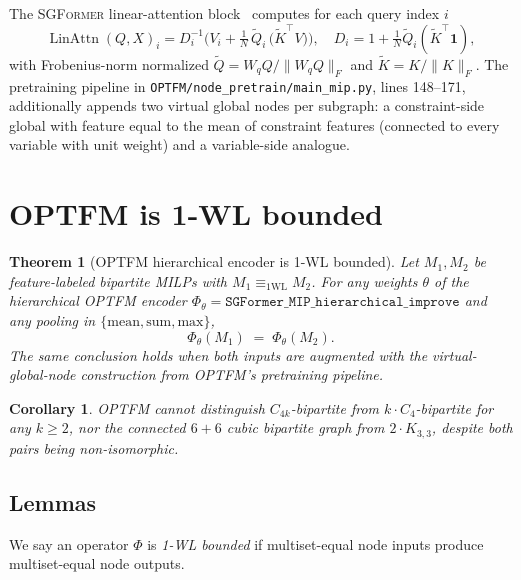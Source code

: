 \documentclass[11pt]{article}
\theoremstyle{plain}
\newtheorem{theorem}{Theorem}
\newtheorem{corollary}{Corollary}
\theoremstyle{definition}
\theoremstyle{remark}
\newcommand{\optfm}{\textsc{OPTFM}}
\newcommand{\sgformer}{\textsc{SGFormer}}
\DeclareMathOperator*{\LinAttn}{LinAttn}
\begin{document}
The \sgformer{} linear-attention block~\cite{wu2023sgformer} computes for each
query index $i$
\begin{equation}\label{eq:linattn}
\LinAttn(Q,X)_i = D_i^{-1}\!\Big(V_i + \tfrac{1}{N}\,\tilde Q_i\,\big(\tilde K^\top V\big)\Big),
\quad D_i = 1 + \tfrac{1}{N}\tilde Q_i (\tilde K^\top \mathbf 1),
\end{equation}
with Frobenius-norm normalized $\tilde Q = W_q Q / \|W_q Q\|_F$ and
$\tilde K = K/\|K\|_F$. The pretraining pipeline in
\texttt{OPTFM/node\_pretrain/main\_mip.py}, lines 148--171, additionally
appends two virtual global nodes per subgraph: a constraint-side global with
feature equal to the mean of constraint features (connected to every variable
with unit weight) and a variable-side analogue.

\section{OPTFM is 1-WL bounded}
\label{sec:theorem}

\begin{theorem}[\optfm{} hierarchical encoder is 1-WL bounded]
\label{thm:main}
Let $M_1, M_2$ be feature-labeled bipartite MILPs with $M_1 \equiv_{1\text{WL}} M_2$.
For \emph{any} weights $\theta$ of the hierarchical \optfm{} encoder
\(\Phi_\theta = \texttt{SGFormer\_MIP\_hierarchical\_improve}\) and any pooling
in $\{\text{mean},\text{sum},\text{max}\}$,
\begin{equation*}
\Phi_\theta(M_1) \;=\; \Phi_\theta(M_2).
\end{equation*}
The same conclusion holds when both inputs are augmented with the
virtual-global-node construction from \optfm{}'s pretraining pipeline.
\end{theorem}

\begin{corollary}\label{cor:concrete}
\optfm{} cannot distinguish $C_{4k}$-bipartite from $k\cdot C_4$-bipartite for
any $k\!\ge\!2$, nor the connected $6{+}6$ cubic bipartite graph from
$2\cdot K_{3,3}$, despite both pairs being non-isomorphic.
\end{corollary}

\subsection{Lemmas}

We say an operator $\Phi$ is \emph{1-WL bounded} if multiset-equal node
inputs produce multiset-equal node outputs.
\end{document}
